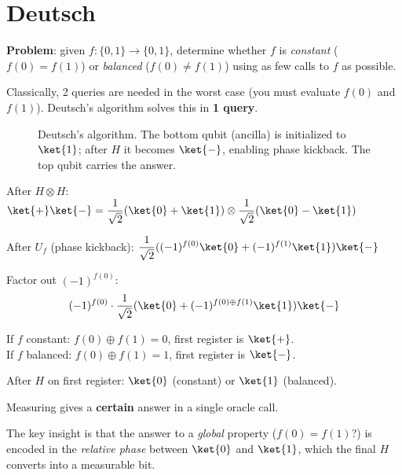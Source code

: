 \documentclass[oneside]{academica}
\begin{document}
\section{Deutsch}

\textbf{Problem}: given $f:\{0,1\}\to\{0,1\}$, determine whether $f$ is \emph{constant} ($f(0)=f(1)$) or \emph{balanced} ($f(0)\neq f(1)$) using as few calls to $f$ as possible.

Classically, 2 queries are needed in the worst case (you must evaluate $f(0)$ and $f(1)$).
Deutsch's algorithm solves this in \textbf{1 query}.

\begin{figure}[H]
  \centering
  \caption{Deutsch's algorithm.
    The bottom qubit (ancilla) is initialized to $\ket{1}$; after $H$ it becomes $\ket{-}$, enabling phase kickback.
    The top qubit carries the answer.
  }
\end{figure}

After $H\otimes H$: $\displaystyle \ket{+}\ket{-}=\frac{1}{\sqrt{2}}(\ket{0}+\ket{1})\otimes\frac{1}{\sqrt{2}}(\ket{0}-\ket{1})$

After $U_f$ (phase kickback): $\displaystyle \frac{1}{\sqrt{2}}((-1)^{f(0)}\ket{0}+(-1)^{f(1)}\ket{1})\ket{-}$

Factor out $(-1)^{f(0)}$:
\begin{equation*}
  (-1)^{f(0)}\cdot\frac{1}{\sqrt{2}}(\ket{0}+(-1)^{f(0)\oplus f(1)}\ket{1})\ket{-}
\end{equation*}

If $f$ constant: $f(0)\oplus f(1)=0$, first register is $\ket{+}$.\\
If $f$ balanced: $f(0)\oplus f(1)=1$, first register is $\ket{-}$.

After $H$ on first register: $\ket{0}$ (constant) or $\ket{1}$ (balanced).

Measuring gives a \textbf{certain} answer in a single oracle call.

\begin{note}
  The key insight is that the answer to a \emph{global} property ($f(0)=f(1)$?) is encoded in the \emph{relative phase} between $\ket{0}$ and $\ket{1}$, which the final $H$ converts into a measurable bit.
\end{note}
\end{document}
